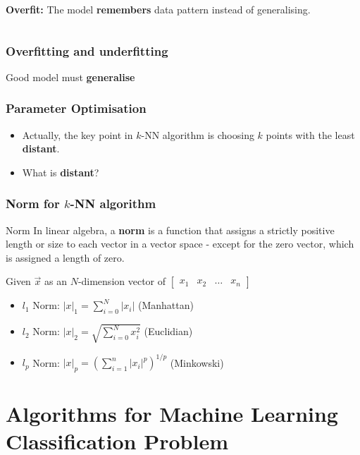 \documentclass[aspectratio=169]{beamer}
\begin{document}
\begin{frame}
\begin{columns}[t]
		 \textbf{Overfit:} The model \textbf{remembers} data pattern instead of generalising.
	\end{columns}
\end{frame}

\begin{frame}
	\frametitle{Overfitting and underfitting}
	\begin{center}
		{\LARGE Good model must \textbf{generalise}}\\
	\end{center}
\end{frame}

\begin{frame}
	\frametitle{Parameter Optimisation}
	\begin{itemize}
		\item Actually, the key point in $k$-NN algorithm is choosing $k$ points with the least \textbf{distant}.
		\item What is \textbf{distant}?
	\end{itemize}
\end{frame}

\begin{frame}
	\frametitle{Norm for $k$-NN algorithm}
	\begin{block}{Norm}
		In linear algebra, a \textbf{norm} is a function that assigns a strictly positive length or size to each vector in a vector space - except for the zero vector, which is assigned a length of zero.
	\end{block}

	Given $\vec{x}$ as an $N$-dimension vector of $\begin{bmatrix}
			x_1 & x_2 & \hdots & x_n
		\end{bmatrix}$
	\begin{itemize}
		\item $l_1$ Norm: $\left|x\right|_1 = \sum_{i=0}^{N}\left|x_i\right|$ (Manhattan)
		\item $l_2$ Norm: $\left|x\right|_2 = \sqrt{\sum_{i=0}^{N}x_i^2}$ (Euclidian)
		\item $l_p$ Norm: $\left|x\right|_p = \left(\sum_{i=1}^n |x_i|^p\right)^{1/p}$ (Minkowski)
	\end{itemize}
\end{frame}

\section{Algorithms for Machine Learning Classification Problem}
\end{document}

